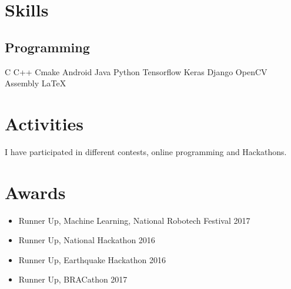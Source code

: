 \documentclass[]{al-jamil-suvo-resume-openfont}
\begin{document}
\begin{minipage}[t]{0.33\textwidth}
\section{Skills}
\subsection{Programming}
C \textbullet{}   C++ \textbullet{} Cmake \textbullet{} Android \textbullet{} Java \textbullet{}
Python \textbullet{} Tensorflow \textbullet{} Keras \textbullet{} Django \textbullet{} OpenCV \textbullet{}   \textbullet{} Assembly \textbullet{} \LaTeX\ \\ 


\section{Activities} 
I have participated in different  contests, online programming and Hackathons.
\sectionsep
\section{Awards}
\begin{itemize}
    \item {} Runner Up, Machine
Learning, National Robotech Festival 2017
\item {}Runner Up, National Hackathon 2016
\item {} Runner Up, Earthquake Hackathon 2016
\item {} Runner Up, BRACathon 2017
\end{itemize}



\sectionsep





%
%

\end{minipage} 
\hfill
\end{document}
